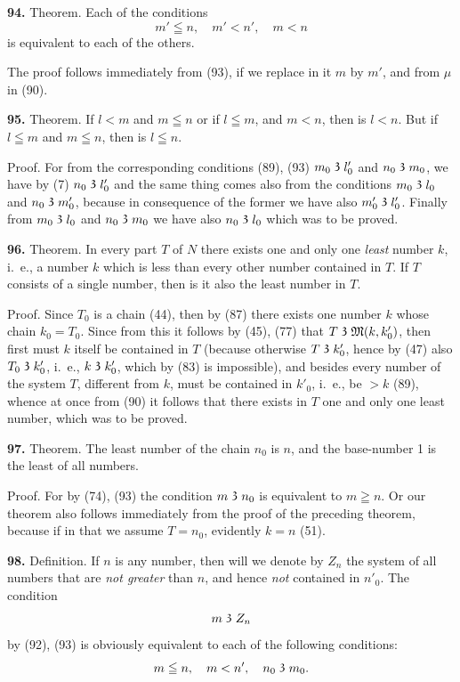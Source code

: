 \documentclass[oneside]{book}
\newcommand\partof{\mathrel{\raisebox{0.45ex}{$\mathfrak{3}$}}}   %
\newcommand\mypara{\medskip\textbf}
\begin{document}
\mypara{94.} Theorem. Each of the conditions
\[
m' \leqq n,\quad m'<n',\quad m<n
\]
is equivalent to each of the others.

The proof follows immediately from (93), if we
replace in it $m$ by $m'$, and from $\mu$ in (90).

\mypara{95.} Theorem. If $l<m$ and $m\leqq n$ or if $l \leqq m$, and
$m<n$, then is $l<n$.  But if $l \leqq m$ and $m \leqq n$, then is
$l \leqq n$.

Proof. For from the corresponding conditions
(89), (93) $m_0 \partof l'_0$ and $n_0 \partof m_0$, we have by (7) $n_0 \partof l'_0$ and
the same thing comes also from the conditions $m_0 \partof l_0$
and $n_0 \partof m'_0$, because in consequence of the former we
have also $m'_0 \partof l'_0$. Finally from $m_0 \partof l_0$ and $n_0 \partof m_0$ we
have also $n_0 \partof l_0$ which was to be proved.

\mypara{96.} Theorem. In every part $T$ of $N$ there exists
one and only one \textit{least} number $k$, i.~e., a number $k$
which is less than every other number contained in
$T$. If $T$ consists of a single number, then is it also
the least number in $T$.

Proof. Since $T_0$ is a chain (44), then by (87) there
exists one number $k$ whose chain $k_0=T_0$. Since from
this it follows by (45), (77) that $T\partof\mathfrak{M}(k, k'_0)$, then
first must $k$ itself be contained in $T$ (because otherwise
$T\partof k'_0$, hence by (47) also $T_0\partof k'_0$, i.~e., $k\partof k'_0$,
which by (83) is impossible), and besides every number
of the system $T$, different from $k$, must be contained
in $k'_0$, i.~e., be $>k$ (89), whence at once from
(90) it follows that there exists in $T$ one and only one
least number, which was to be proved.

\mypara{97.} Theorem. The least number of the chain $n_0$ is
$n$, and the base-number 1 is the least of all numbers.

Proof. For by (74), (93) the condition $m\partof n_0$ is
equivalent to $m\geqq n$. Or our theorem also follows immediately
from the proof of the preceding theorem,
because if in that we assume $T=n_0$, evidently $k=n$
(51).

\mypara{98.} Definition. If $n$ is any number, then will we
denote by $Z_n$ the system of all numbers that are \emph{not
greater} than $n$, and hence \emph{not} contained in $n'_0$. The
condition
\[
m\partof Z_n
\]
by (92), (93) is obviously equivalent to each of the
following conditions:
\[
m\leqq n,\quad m<n',\quad n_0\partof m_0.
\]
\end{document}
